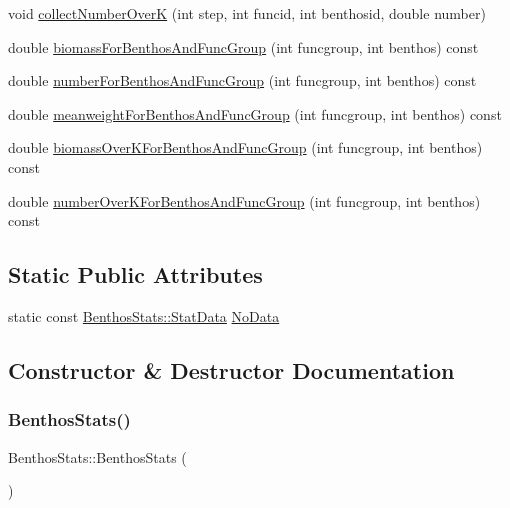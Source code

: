 \begin{DoxyCompactItemize}
void \mbox{\hyperlink{class_benthos_stats_a02203ec3e33bbbb3a69a072ad8260ab4}{collect\+Number\+OverK}} (int step, int funcid, int benthosid, double number)
\item 
double \mbox{\hyperlink{class_benthos_stats_a52417111c3b48a62c7b0cb1276bd1438}{biomass\+For\+Benthos\+And\+Func\+Group}} (int funcgroup, int benthos) const
\item 
double \mbox{\hyperlink{class_benthos_stats_a8b5e30e63913e97ab2700e4069aab03d}{number\+For\+Benthos\+And\+Func\+Group}} (int funcgroup, int benthos) const
\item 
double \mbox{\hyperlink{class_benthos_stats_a04200e196a43e84fce95871a83a36391}{meanweight\+For\+Benthos\+And\+Func\+Group}} (int funcgroup, int benthos) const
\item 
double \mbox{\hyperlink{class_benthos_stats_a15507bcae7609f57495e5857b9a773a8}{biomass\+Over\+K\+For\+Benthos\+And\+Func\+Group}} (int funcgroup, int benthos) const
\item 
double \mbox{\hyperlink{class_benthos_stats_ab7ef495b4628fe7b039afc1caf7ebdf9}{number\+Over\+K\+For\+Benthos\+And\+Func\+Group}} (int funcgroup, int benthos) const
\end{DoxyCompactItemize}
\subsection*{Static Public Attributes}
\begin{DoxyCompactItemize}
\item 
static const \mbox{\hyperlink{struct_benthos_stats_1_1_stat_data}{Benthos\+Stats\+::\+Stat\+Data}} \mbox{\hyperlink{class_benthos_stats_a8720f61b965c406a6620aa1b62a8e4c8}{No\+Data}}
\end{DoxyCompactItemize}


\subsection{Constructor \& Destructor Documentation}
\mbox{\label{class_benthos_stats_a47e02340d02e7e47c02a1677e70354c0}} 
\subsubsection{\texorpdfstring{BenthosStats()}{BenthosStats()}\hspace{0.1cm}{\footnotesize\ttfamily [1/3]}}
{\footnotesize\ttfamily Benthos\+Stats\+::\+Benthos\+Stats (\begin{DoxyParamCaption}{ }\end{DoxyParamCaption})}

